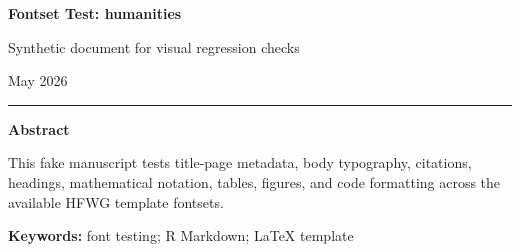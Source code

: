 \documentclass[12pt]{article}
\newif\ifhfwganon
\begin{document}
\begin{titlepage}
\thispagestyle{empty}
\vspace*{0.12\textheight}
\begin{center}
\begin{singlespace}

{\LARGE\bfseries Fontset Test: humanities\par}

\vspace{0.35em}
{\large Synthetic document for visual regression checks\par}

\vspace{2.2em}

\hfwgauthorblock

\par\vspace{1.5\baselineskip}
\hfwgseriesblock

\ifhfwganon\else
\vspace{0.35em}
{\small May 2026}\par
\fi

\vspace{2.2\baselineskip}
\noindent\rule{0.35\textwidth}{0.4pt}\par
\vspace{0.65em}
\begin{minipage}{0.78\textwidth}
\small\singlespacing
\textbf{Abstract}\par\vspace{0.3em}
This fake manuscript tests title-page metadata, body typography,
citations, headings, mathematical notation, tables, figures, and code
formatting across the available HFWG template fontsets.
\par\vspace{0.6em}
\textbf{Keywords:} font testing; R Markdown; LaTeX template
\end{minipage}

\end{singlespace}
\end{center}
\vfill
\end{titlepage}
\else
\end{document}
